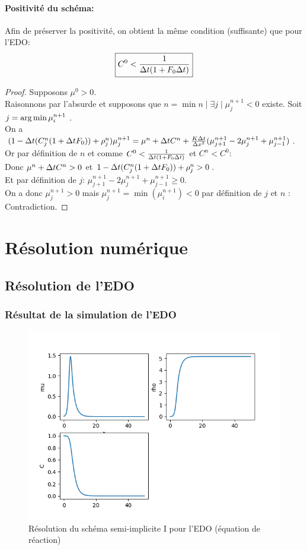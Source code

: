 \documentclass[11pt]{article}
\begin{document}
\paragraph{Positivité du schéma:}
Afin de préserver la positivité, on obtient la même condition (suffisante) que pour l'EDO:
\begin{equation}
	\boxed{C^0< \frac{1}{\Delta t(1+F_0\Delta t)}}
\end{equation}
\begin{proof} Supposons $\mu^0 >0$.\\ Raisonnons par l'absurde et supposons que $n=\min{n \mid \exists j \mid \mu^{n+1}_j < 0} $ existe. Soit $j = \operatorname*{arg\,min}{\mu^{n+1}_i} $ .\\

On a $(1-\Delta t(C^{n}_j(1+\Delta t F_0)) + \rho^{n}_j)\mu^{n+1}_j = \mu^{n}+  \Delta t C^{n} +\frac{K\Delta t}{\Delta x^2}(\mu^{n+1}_{j+1} - 2\mu^{n+1}_j + \mu^{n+1}_{j-1}) $. \\
Or par définition de $n$ et comme $C^0< \frac{1}{\Delta t(1+F_0\Delta t)}$ et $C^n < C^0$:\\
 Donc $ \mu^{n}+  \Delta t C^{n} > 0$ et
 $ 1-\Delta t(C^{n}_j(1+\Delta t F_0)) + \rho^{n}_j > 0$. \\
Et par définition de $j$: 
$\mu^{n+1}_{j+1} - 2\mu^{n+1}_j + \mu^{n+1}_{j-1} \geq 0$.\\
On a donc $\mu^{n+1}_j > 0$ mais   $\mu^{n+1}_j = \min(\mu^{n+1}_i) < 0$ par définition de $j$ et $n$ : Contradiction.
\end{proof}

\newpage
\section{Résolution numérique}
\subsection{Résolution de l'EDO}
\subsubsection{Résultat de la simulation de l'EDO}
\begin{figure}[hbt!]
\centering
\includegraphics[width=.9\textwidth]{Images/edo_euler_implicite.png}
\caption{Résolution du schéma semi-implicite I pour l'EDO (équation de réaction)}
\end{figure}
\end{document}
